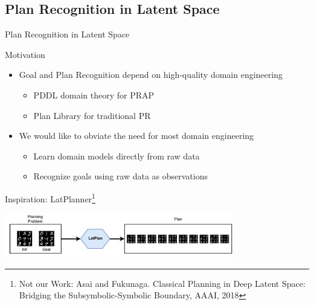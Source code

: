\documentclass[usenames,dvipsnames]{beamer}
\begin{document}
\subsection{Plan Recognition in Latent Space}

\begin{frame}[c]
	\begin{center}
		\Large{Plan Recognition in Latent Space}
	\end{center}
\end{frame}

\begin{frame}[c]{Motivation}
	\begin{itemize}
		\item Goal and Plan Recognition depend on high-quality domain engineering
		\begin{itemize}
			\item PDDL domain theory for PRAP
			\item Plan Library for traditional PR
		\end{itemize}
		\item We would like to obviate the need for most domain engineering
		\begin{itemize}
			\item Learn domain models directly from raw data
			\item Recognize goals using raw data as observations
		\end{itemize}
	\end{itemize}
\end{frame}

\begin{frame}[c]{Inspiration: LatPlanner\footnote{\tiny Not our Work: Asai and Fukunaga. Classical Planning in Deep Latent Space: Bridging the Subsymbolic-Symbolic Boundary, AAAI, 2018}}
	\begin{center}
		\includegraphics[width=10cm]{fig/latplan.pdf}
	\end{center}
\end{frame}
\end{document}
